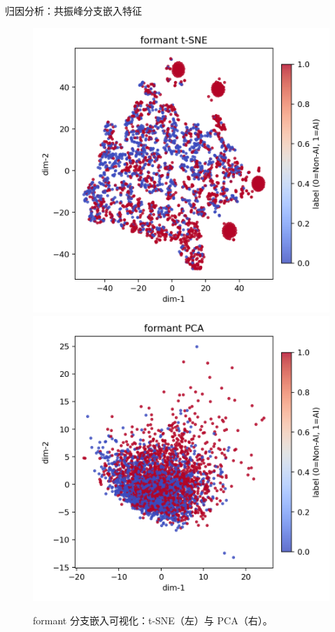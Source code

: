\documentclass[aspectratio=169]{beamer}
\begin{document}
\begin{frame}{归因分析：共振峰分支嵌入特征}
\begin{figure}
  \centering
  \includegraphics[width=0.45\linewidth]{images_in_paper/embed_formant_tsne.png}
  \hfill
  \includegraphics[width=0.45\linewidth]{images_in_paper/embed_formant_pca.png}
  \caption{formant 分支嵌入可视化：t-SNE（左）与 PCA（右）。}
  \label{fig:formant_embed}
\end{figure}

\end{frame}
\end{document}
